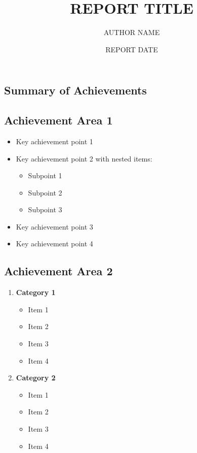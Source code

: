 \documentclass[10pt,a4paper]{article}
\title{\vspace{-1.5cm}\textbf{\large{REPORT TITLE}}}
\author{\small{AUTHOR NAME}}
\date{\small{REPORT DATE}}
\begin{document}
\maketitle
\vspace{-1.2cm}

\begin{multicols}{2}
\section*{Summary of Achievements}

\subsection*{Achievement Area 1}
\begin{itemize}\small
  \item Key achievement point 1
  \item Key achievement point 2 with nested items:
    \begin{itemize}
      \item Subpoint 1
      \item Subpoint 2
      \item Subpoint 3
    \end{itemize}
  \item Key achievement point 3
  \item Key achievement point 4
\end{itemize}

\subsection*{Achievement Area 2}
\begin{enumerate}\small
  \item \textbf{Category 1}
    \begin{itemize}
      \item Item 1
      \item Item 2
      \item Item 3
      \item Item 4
    \end{itemize}
  
  \item \textbf{Category 2}
    \begin{itemize}
      \item Item 1
      \item Item 2
      \item Item 3
      \item Item 4
    \end{itemize}
\end{enumerate}


\end{multicols}
\end{document}
